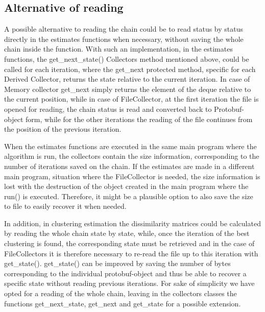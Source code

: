 \subsection{Alternative of reading}

A possible alternative to reading the chain could be to read status by status directly in the estimates functions when necessary, without saving the whole chain inside the function. 
With such an implementation, in the estimates functions, the get\_next\_state() Collectors method mentioned above, could be called for each iteration, where the get\_next protected method, specific for each Derived Collector, returns the state relative to the current iteration. 
In case of Memory collector get\_next simply returns the element of the deque relative to the current position, while in case of FileCollector, at the first iteration the file is opened for reading, the chain status is read and converted back to Protobuf-object form, while for the other iterations the reading of the file continues from the position of the previous iteration.

When the estimates functions are executed in the same main program where the algorithm is run, the collectors contain the size information, corresponding to the number of iterations saved on the chain. 
If the estimates are made in a different main program, situation where the FileCollector is needed, the size information is lost with the destruction of the object created in the main program where the run() is executed. Therefore, it might be a plausible option to also save the size to file to easily recover it when needed. 

In addition, in clustering estimation the dissimilarity matrices could be calculated by reading the whole chain state by state, while, once the iteration of the best clustering is found, the corresponding state must be retrieved and in the case of FileCollectors it is therefore necessary to re-read the file up to this iteration with get\_state(). get\_state() can be improved by saving the number of bytes corresponding to the individual protobuf-object and thus be able to recover a specific state without reading previous iterations. For sake of simplicity we have opted for a reading of the whole chain, leaving in the collectors classes the functions get\_next\_state, get\_next and get\_state for a possible extension.
